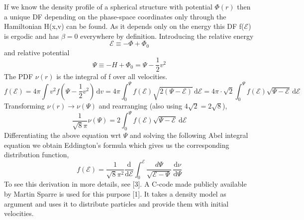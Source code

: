 If we know the density profile of a spherical structure with potential $\Phi(r)$ then a unique DF depending on the phase-space coordinates only through the Hamiltonian H(x,v) can be found. As it depends only on the energy this DF f($\mathcal{E}$) is ergodic and has $\beta = 0$ everywhere by definition. Introducing the relative energy 
\begin{equation} 
\mathcal{E} \equiv -\Phi+\Phi_0
\end{equation}
and relative potential 
\begin{equation} 
\Psi \equiv -H+\Phi_0 = \Psi - \frac{1}{2}v^2
\end{equation}
The PDF $\nu(r)$ is the integral of f over all velocities.  
\begin{equation} 
f(\mathcal{E}) = 4\pi \int \! v^2 f(\Psi - \frac{1}{2}v^2) \, \mathrm{d}v =
4\pi \int_{0}^{\Psi} \! f(\mathcal{E}) \sqrt{2(\Psi - \mathcal{E})} \, \mathrm{d}\mathcal{E} =
4\pi \cdot \sqrt{2} \int_{0}^{\Psi} \! f(\mathcal{E}) \sqrt{\Psi - \mathcal{E}} \, \mathrm{d}\mathcal{E}
\end{equation}
Transforming $\nu(r) \rightarrow \nu(\Psi)$ and rearranging (also using $4 \sqrt{2} = 2 \sqrt{8}$),
\begin{equation} 
\frac{1}{\sqrt{8}\pi}\nu(\Psi) = 2\int_{0}^{\Psi} \! f(\mathcal{E}) \sqrt{\Psi - \mathcal{E}} \, \mathrm{d}\mathcal{E}
\end{equation}
Differentiating the above equation wrt $\Psi$ and solving the following Abel integral equation we obtain Eddington's formula which gives us the corresponding distribution function,
\begin{equation} 
f(\mathcal{E}) = \frac{1}{\sqrt{8}\pi^2}\frac{\mathrm{d}}{\mathrm{d}\mathcal{E}}
\int_{0}^{\mathcal{E}} \! \frac{d \Psi}{\sqrt{\mathcal{E}-\Psi}} \, \frac{\mathrm{d}\nu}{\mathrm{d}\Psi} 
\end{equation}
To see this derivation in more details, see [3].
A C-code made publicly available by Martin Sparre is used for this purpose [1]. It takes a density model as argument and uses it to distribute particles and provide them with initial velocities.
